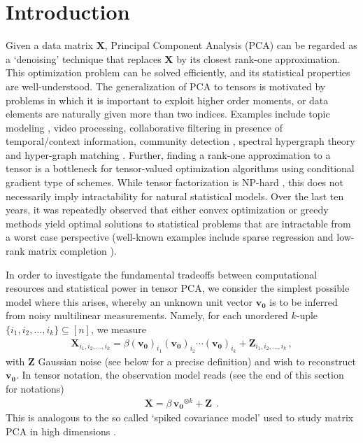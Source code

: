 \documentclass[11pt]{article}
\theoremstyle{definition}
\def\bvz{\mathbf{v_0}}
\def\bX{\mathbf{X}}
\def\bZ{\mathbf{Z}}
\begin{document}
\section{Introduction}
%
Given a data matrix $\bX$, Principal Component Analysis (PCA) can be
regarded as a `denoising' technique that replaces $\bX$ by its closest
rank-one approximation. This optimization problem can be solved
efficiently, and its statistical properties are well-understood.
The generalization of PCA to tensors is motivated by problems in which it
is important to exploit higher order moments, or data elements are
naturally given more than two indices. Examples include  topic
modeling \cite{anandkumar12}, video processing,
 collaborative filtering in presence of temporal/context
 information, community detection \cite{anandkumar2013tensor},  spectral hypergraph theory and hyper-graph
 matching \cite{Duchenne09}. 
Further, finding a rank-one approximation to a tensor is a bottleneck for  tensor-valued optimization
algorithms using conditional gradient type of schemes. 
While tensor factorization is NP-hard \cite{hillar2013most}, this does not
necessarily imply intractability for natural statistical
models. Over the last ten years, it was repeatedly observed that
either convex optimization or greedy methods yield optimal solutions
to statistical problems that are intractable from a worst case
perspective (well-known examples include sparse regression \cite{donoho2003optimally,tropp2004greed,candes2007dantzig} and
low-rank matrix completion \cite{candes2009exact,keshavan2010matrix}).

In order to investigate the fundamental  tradeoffs between
computational resources and statistical power in
tensor PCA, we consider the simplest possible model where this arises,
whereby an  unknown unit vector $\bvz$ is to be inferred
from noisy multilinear  measurements. Namely, for each unordered
$k$-uple 
$\{i_1,i_2,\dots,i_k\}\subseteq [n]$, we measure  
%
\begin{align}
%
\bX_{i_1,i_2,\dots,i_k} =
\beta(\bvz)_{i_1}(\bvz)_{i_2}\cdots(\bvz)_{i_k} +
\bZ_{i_1,i_2,\dots,i_k} \, ,
%
\end{align}
%
with $\bZ$ Gaussian noise (see below for a precise definition)
and wish to reconstruct $\bvz$. 
In tensor notation, the observation model reads (see the end of this
section for notations)
%
\begin{align}\tag*{Spiked Tensor Model}
%
\bX = \beta\, \bvz^{\otimes k} + \bZ~~. \label{eq:SymmetricModel}
%
\end{align}
%
This is analogous to the so called `spiked covariance model'  used to
study matrix PCA in high dimensions
\cite{johnstone2009consistency}.
\end{document}
